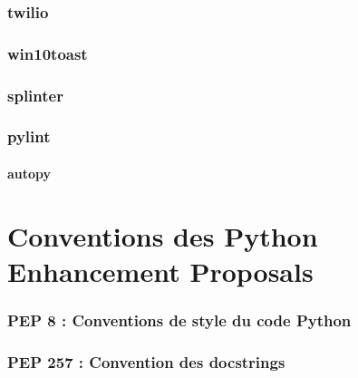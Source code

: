 \documentclass[a4paper, 10pt]{article}
\begin{document}
\section{twilio}
\section{win10toast}
\section{splinter}
\section{pylint}

\subsection{autopy}

\part{Conventions des Python Enhancement Proposals}
\section{PEP 8 : Conventions de style du code Python}
\section{PEP 257 : Convention des docstrings}


\printindex
\end{document}
